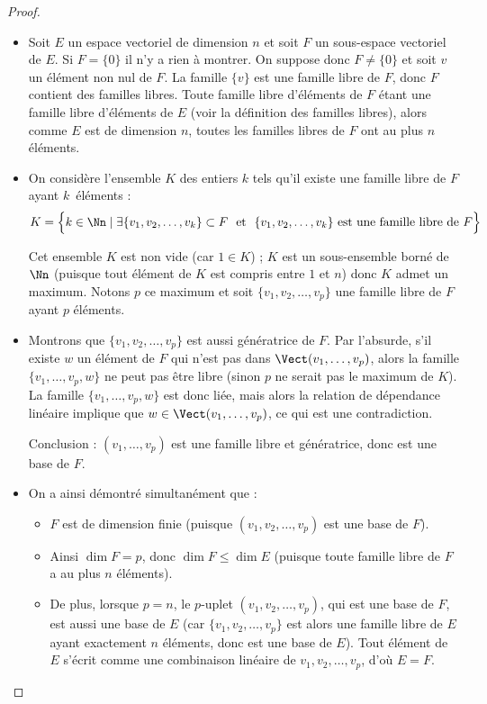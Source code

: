 \documentclass[class=report,crop=false]{standalone}
\begin{document}
\begin{proof}
~
\begin{itemize}
  \item Soit $E$ un espace vectoriel de dimension $n$ et soit $F$ un sous-espace vectoriel de $E$.
Si $F = \{0\}$ il n'y a rien à montrer. On suppose donc $F \neq \{0\}$ et
soit $v$ un élément non nul de $F$.
La famille  $\{v\}$ est une famille libre de $F$, donc $F$ contient des familles libres.
Toute famille libre d'éléments de $F$ étant une famille libre d'éléments de $E$
(voir la définition des familles libres), alors comme $E$ est de dimension $n$,
toutes les familles libres de $F$ ont au plus $n$ éléments.

  \item On considère l'ensemble $K$ des entiers $k$ tels qu'il existe une famille libre de $F$ ayant $k$~éléments :
$$K = \Big\{ k \in \Nn \mid \exists \{v_1,v_2, \ldots ,v_k\} \subset F
\ \text{ et } \  \{v_1, v_2, \ldots, v_k \} \text{ est une famille libre de } F \Big\}$$

Cet ensemble $K$ est non vide (car $1 \in K$) ; $K$ est un sous-ensemble borné de $\Nn$
(puisque tout élément de $K$ est compris entre $1$ et $n$) donc $K$ admet un maximum.
Notons $p$ ce maximum et soit $\{v_1,v_2,\dots ,v_p\}$ une famille libre de $F$ ayant $p$ éléments.

  \item Montrons que $\{v_1,v_2,\dots ,v_p\}$ est aussi génératrice de $F$.
Par l'absurde, s'il existe $w$ un élément de $F$ qui n'est pas dans $\Vect (v_1,\ldots,v_p)$,
alors la famille $\{v_1,\ldots,v_p,w\}$ ne peut pas être libre (sinon $p$ ne serait pas le maximum de $K$).
La famille $\{v_1,\ldots,v_p,w\}$ est donc liée, mais alors la relation de dépendance linéaire implique
que $w \in \Vect(v_1,\ldots,v_p)$, ce qui est une contradiction.

Conclusion : $(v_1,\ldots,v_p)$ est une famille libre et génératrice, donc est une base de $F$.


  \item On a ainsi démontré simultanément que :
  \begin{itemize}
    \item $F$ est de dimension finie (puisque  $(v_1,v_2,\dots ,v_p)$ est une base de $F$).

    \item Ainsi $\dim F = p$, donc $\dim F \leq \dim E$ (puisque toute famille libre de $F$ a au plus $n$ éléments).

    \item De plus, lorsque $p=n$, le $p$-uplet $(v_1,v_2,\dots ,v_p)$,
    qui est une base de $F$, est aussi une base de $E$ (car $\{v_1,v_2,\dots ,v_p\}$
   est alors une famille libre de $E$ ayant exactement $n$ éléments, donc est une base de $E$).
   Tout élément de $E$ s'écrit comme une combinaison linéaire de $v_1,v_2,\dots ,v_p$,
   d'où $E=F$.
  \end{itemize}


\end{itemize}







\end{proof}
\end{document}
